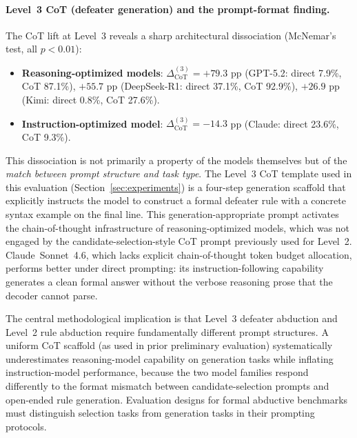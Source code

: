 \documentclass{article}
\theoremstyle{definition}
\begin{document}
\paragraph{Level~3 CoT (defeater generation) and the prompt-format finding.}
The CoT lift at Level~3 reveals a sharp architectural dissociation (McNemar's test, all $p < 0.01$):

\begin{itemize}[nosep]
    \item \textbf{Reasoning-optimized models}: $\Delta_{\mathrm{CoT}}^{(3)} = +79.3$ pp (GPT-5.2: direct 7.9\%, CoT 87.1\%), $+55.7$ pp (DeepSeek-R1: direct 37.1\%, CoT 92.9\%), $+26.9$ pp (Kimi: direct 0.8\%, CoT 27.6\%).
    \item \textbf{Instruction-optimized model}: $\Delta_{\mathrm{CoT}}^{(3)} = -14.3$ pp (Claude: direct 23.6\%, CoT 9.3\%).
\end{itemize}

This dissociation is not primarily a property of the models themselves but of the \emph{match between prompt structure and task type}. The Level~3 CoT template used in this evaluation (Section~\ref{sec:experiments}) is a four-step generation scaffold that explicitly instructs the model to construct a formal defeater rule with a concrete syntax example on the final line. This generation-appropriate prompt activates the chain-of-thought infrastructure of reasoning-optimized models, which was not engaged by the candidate-selection-style CoT prompt previously used for Level~2. Claude~Sonnet~4.6, which lacks explicit chain-of-thought token budget allocation, performs better under direct prompting: its instruction-following capability generates a clean formal answer without the verbose reasoning prose that the decoder cannot parse.

The central methodological implication is that Level~3 defeater abduction and Level~2 rule abduction require fundamentally different prompt structures. A uniform CoT scaffold (as used in prior preliminary evaluation) systematically underestimates reasoning-model capability on generation tasks while inflating instruction-model performance, because the two model families respond differently to the format mismatch between candidate-selection prompts and open-ended rule generation. Evaluation designs for formal abductive benchmarks must distinguish selection tasks from generation tasks in their prompting protocols.
\end{document}
